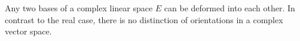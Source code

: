 Any two bases of a complex linear space $E$ can be deformed into each other. In contrast to the real case, there is no distinction of orientations in a complex vector space.
